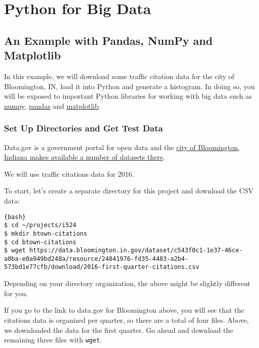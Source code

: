 \section{Python for Big Data}\label{python-for-big-data}

\subsection{An Example with Pandas, NumPy and Matplotlib}\label{an-example-with-pandas-numpy-and-matplotlib}

In this example, we will download some traffic citation data for the
city of Bloomington, IN, load it into Python and generate a histogram.
In doing so, you will be exposed to important Python libraries for
working with big data such as \href{www.numpy.org}{numpy},
\href{pandas.pydata.org}{pandas} and \href{matplotlib.org}{matplotlib}.

\subsubsection{Set Up Directories and Get Test
Data}\label{set-up-directories-and-get-test-data}

Data.gov is a government portal for open data and the
\href{https://catalog.data.gov/dataset?organization_type=City+Government\&organization=city-of-bloomington\&_organization_limit=0}{city
of Bloomington, Indiana makes available a number of datasets there}.

We will use traffic citations data for 2016.

To start, let's create a separate directory for this project and
download the CSV data:

\begin{lstlisting}{bash}
$ cd ~/projects/i524
$ mkdir btown-citations
$ cd btown-citations
$ wget https://data.bloomington.in.gov/dataset/c543f0c1-1e37-46ce-a0ba-e0a949bd248a/resource/24841976-fd35-4483-a2b4-573bd1e77cfb/download/2016-first-quarter-citations.csv
\end{lstlisting}

Depending on your directory organization, the above might be slightly
different for you.

If you go to the link to data.gov for Bloomington above, you will see
that the citations data is organized per quarter, so there are a total
of four files. Above, we downloaded the data for the first quarter. Go
ahead and download the remaining three files with \texttt{wget}.

